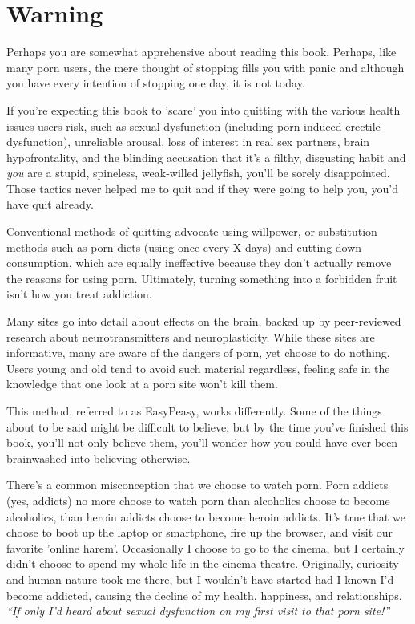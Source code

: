 \documentclass[
]{book}
\begin{document}
\hypertarget{warning}{%
\section*{Warning}\label{warning}}

Perhaps you are somewhat apprehensive about reading this book. Perhaps, like many porn users, the mere thought of stopping fills you with panic and although you have every intention of stopping one day, it is not today.

If you're expecting this book to 'scare' you into quitting with the various health issues users risk, such as sexual dysfunction (including porn induced erectile dysfunction), unreliable arousal, loss of interest in real sex partners, brain hypofrontality, and the blinding accusation that it's a filthy, disgusting habit and \emph{you} are a stupid, spineless, weak-willed jellyfish, you'll be sorely disappointed. Those tactics never helped me to quit and if they were going to help you, you'd have quit already.

Conventional methods of quitting advocate using willpower, or substitution methods such as porn diets (using once every X days) and cutting down consumption, which are equally ineffective because they don't actually remove the reasons for using porn. Ultimately, turning something into a forbidden fruit isn't how you treat addiction.

Many sites go into detail about effects on the brain, backed up by peer-reviewed research about neurotransmitters and neuroplasticity. While these sites are informative, many are aware of the dangers of porn, yet choose to do nothing. Users young and old tend to avoid such material regardless, feeling safe in the knowledge that one look at a porn site won't kill them.

This method, referred to as EasyPeasy, works differently. Some of the things about to be said might be difficult to believe, but by the time you've finished this book, you'll not only believe them, you'll wonder how you could have ever been brainwashed into believing otherwise.

There's a common misconception that we choose to watch porn. Porn addicts (yes, addicts) no more choose to watch porn than alcoholics choose to become alcoholics, than heroin addicts choose to become heroin addicts. It's true that we choose to boot up the laptop or smartphone, fire up the browser, and visit our favorite 'online harem'. Occasionally I choose to go to the cinema, but I certainly didn't choose to spend my whole life in the cinema theatre. Originally, curiosity and human nature took me there, but I wouldn't have started had I known I'd become addicted, causing the decline of my health, happiness, and relationships. \emph{``If only I'd heard about sexual dysfunction on my first visit to that porn site!''}
\end{document}
